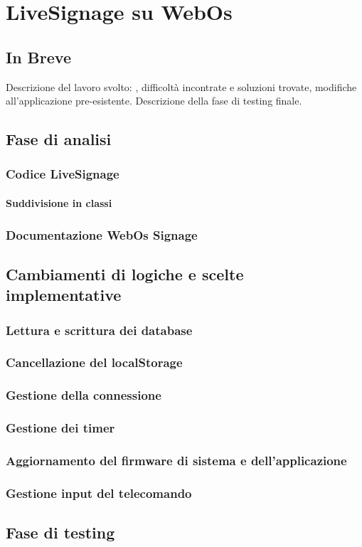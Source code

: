 \chapter{LiveSignage su WebOs}\label{svolgimento}
\section{In Breve}
Descrizione del lavoro svolto: , difficoltà incontrate e soluzioni trovate, modifiche all'applicazione pre-esistente. Descrizione della fase di testing finale.

\section{Fase di analisi}
\subsection{Codice LiveSignage}
\subsubsection{Suddivisione in classi}
\subsection{Documentazione WebOs Signage}

\section{Cambiamenti di logiche e scelte implementative}
\subsection{Lettura e scrittura dei database} \label{database}
\subsection{Cancellazione del localStorage}
\subsection{Gestione della connessione}
\subsection{Gestione dei timer}
\subsection{Aggiornamento del firmware di sistema e dell'applicazione}
\subsection{Gestione input del telecomando}

\section{Fase di testing}


